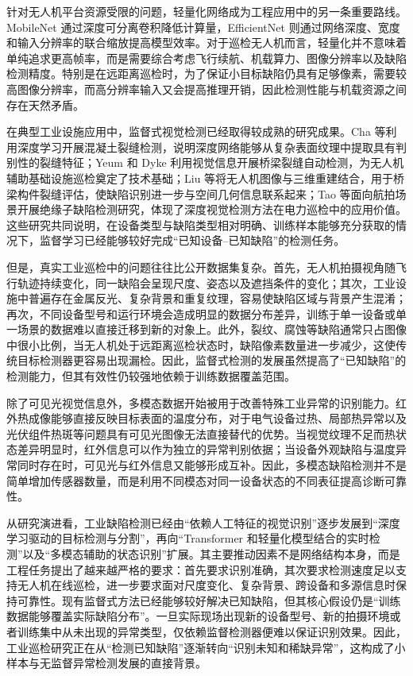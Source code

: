 针对无人机平台资源受限的问题，轻量化网络成为工程应用中的另一条重要路线。MobileNet 通过深度可分离卷积降低计算量，EfficientNet 则通过网络深度、宽度和输入分辨率的联合缩放提高模型效率\cite{howard2017mobilenets,tan2019efficientnet}。对于巡检无人机而言，轻量化并不意味着单纯追求更高帧率，而是需要综合考虑飞行续航、机载算力、图像分辨率以及缺陷检测精度。特别是在远距离巡检时，为了保证小目标缺陷仍具有足够像素，需要较高图像分辨率，而高分辨率输入又会提高推理开销，因此检测性能与机载资源之间存在天然矛盾。

在典型工业设施应用中，监督式视觉检测已经取得较成熟的研究成果。Cha 等利用深度学习开展混凝土裂缝检测，说明深度网络能够从复杂表面纹理中提取具有判别性的裂缝特征\cite{cha2017deep}；Yeum 和 Dyke 利用视觉信息开展桥梁裂缝自动检测，为无人机辅助基础设施巡检奠定了技术基础\cite{yeum2015vision}；Liu 等将无人机图像与三维重建结合，用于桥梁构件裂缝评估，使缺陷识别进一步与空间几何信息联系起来\cite{liu2020image}；Tao 等面向航拍场景开展绝缘子缺陷检测研究，体现了深度视觉检测方法在电力巡检中的应用价值\cite{tao2020detection}。这些研究共同说明，在设备类型与缺陷类型相对明确、训练样本能够充分获取的情况下，监督学习已经能够较好完成“已知设备--已知缺陷”的检测任务。

但是，真实工业巡检中的问题往往比公开数据集复杂。首先，无人机拍摄视角随飞行轨迹持续变化，同一缺陷会呈现尺度、姿态以及遮挡条件的变化；其次，工业设施中普遍存在金属反光、复杂背景和重复纹理，容易使缺陷区域与背景产生混淆；再次，不同设备型号和运行环境会造成明显的数据分布差异，训练于单一设备或单一场景的数据难以直接迁移到新的对象上\cite{taox2021survey,zhouwq2024review}。此外，裂纹、腐蚀等缺陷通常只占图像中很小比例，当无人机处于远距离巡检状态时，缺陷像素数量进一步减少，这使传统目标检测器更容易出现漏检。因此，监督式检测的发展虽然提高了“已知缺陷”的检测能力，但其有效性仍较强地依赖于训练数据覆盖范围。

除了可见光视觉信息外，多模态数据开始被用于改善特殊工业异常的识别能力。红外热成像能够直接反映目标表面的温度分布，对于电气设备过热、局部热异常以及光伏组件热斑等问题具有可见光图像无法直接替代的优势\cite{jadin2012recent,usamentiaga2014infrared}。当视觉纹理不足而热状态差异明显时，红外信息可以作为独立的异常判别依据；当设备外观缺陷与温度异常同时存在时，可见光与红外信息又能够形成互补。因此，多模态缺陷检测并不是简单增加传感器数量，而是利用不同模态对同一设备状态的不同表征提高诊断可靠性。

从研究演进看，工业缺陷检测已经由“依赖人工特征的视觉识别”逐步发展到“深度学习驱动的目标检测与分割”，再向“Transformer 和轻量化模型结合的实时检测”以及“多模态辅助的状态识别”扩展。其主要推动因素不是网络结构本身，而是工程任务提出了越来越严格的要求：首先要求识别准确，其次要求检测速度足以支持无人机在线巡检，进一步要求面对尺度变化、复杂背景、跨设备和多源信息时保持可靠性。现有监督式方法已经能够较好解决已知缺陷，但其核心假设仍是“训练数据能够覆盖实际缺陷分布”。一旦实际现场出现新的设备型号、新的拍摄环境或者训练集中从未出现的异常类型，仅依赖监督检测器便难以保证识别效果。因此，工业巡检研究正在从“检测已知缺陷”逐渐转向“识别未知和稀缺异常”，这构成了小样本与无监督异常检测发展的直接背景。

